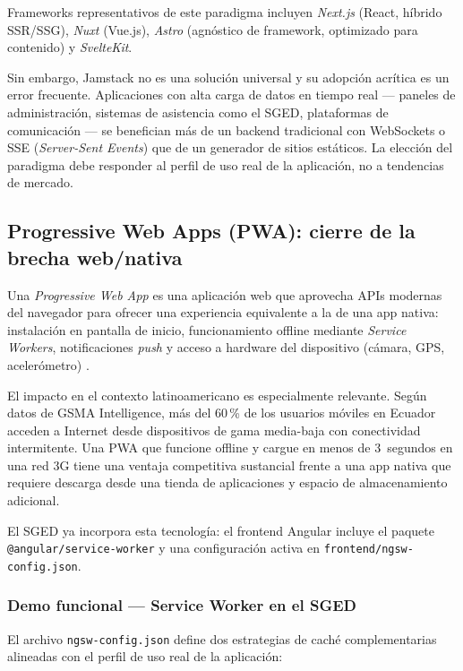 \documentclass[12pt,a4paper]{article}
\begin{document}
Frameworks representativos de este paradigma incluyen \textit{Next.js} (React, híbrido
SSR/SSG), \textit{Nuxt} (Vue.js), \textit{Astro} (agnóstico de framework, optimizado para
contenido) y \textit{SvelteKit}.

Sin embargo, Jamstack no es una solución universal y su adopción acrítica es un error
frecuente.
Aplicaciones con alta carga de datos en tiempo real --- paneles de administración, sistemas de
asistencia como el SGED, plataformas de comunicación --- se benefician más de un backend
tradicional con WebSockets o SSE (\textit{Server-Sent Events}) que de un generador de sitios
estáticos.
La elección del paradigma debe responder al perfil de uso real de la aplicación, no a
tendencias de mercado.

\subsection{Progressive Web Apps (PWA): cierre de la brecha web/nativa}

Una \textit{Progressive Web App} es una aplicación web que aprovecha APIs modernas del
navegador para ofrecer una experiencia equivalente a la de una app nativa: instalación en
pantalla de inicio, funcionamiento offline mediante \textit{Service Workers}, notificaciones
\textit{push} y acceso a hardware del dispositivo (cámara, GPS, acelerómetro)
\parencite{mozilla2023}.

El impacto en el contexto latinoamericano es especialmente relevante.
Según datos de GSMA Intelligence, más del 60\,\% de los usuarios móviles en Ecuador acceden
a Internet desde dispositivos de gama media-baja con conectividad intermitente.
Una PWA que funcione offline y cargue en menos de 3~segundos en una red 3G tiene una
ventaja competitiva sustancial frente a una app nativa que requiere descarga desde una
tienda de aplicaciones y espacio de almacenamiento adicional.

El SGED ya incorpora esta tecnología: el frontend Angular incluye el paquete
\texttt{@angular/service-worker} y una configuración activa en
\texttt{frontend/ngsw-config.json}.

\subsubsection{Demo funcional --- Service Worker en el SGED}

El archivo \texttt{ngsw-config.json} define dos estrategias de caché complementarias
alineadas con el perfil de uso real de la aplicación:
\end{document}
